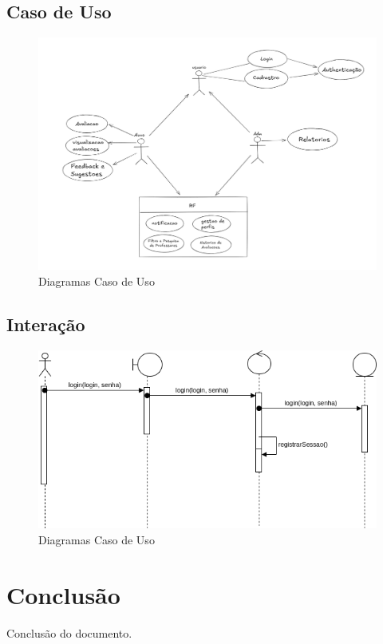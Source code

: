 \documentclass[12pt]{article}
\begin{document}
\subsection{Caso de Uso}
\begin{figure}[h]
\centering
\includegraphics[width=1\textwidth]{useCaseProfScore.png} %
\caption{Diagramas Caso de Uso}
\end{figure}
\clearpage
\subsection{Interação}
\begin{figure}[h]
\centering
\includegraphics[width=1\textwidth]{diagramaInteracao.drawio.png} %
\caption{Diagramas Caso de Uso}
\end{figure}


\section{Conclusão}
Conclusão do documento.
\end{document}
